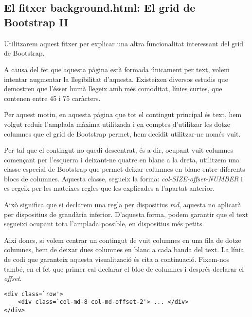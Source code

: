 \subsection{El fitxer background.html: El grid de Bootstrap II}

    \paragraph{}
    Utilitzarem aquest fitxer per explicar una altra funcionalitat interessant del grid de Bootstrap.

    A causa del fet que aquesta pàgina està formada únicament per text, volem intentar augmentar la llegibilitat d'aquesta. Existeixen diversos estudis que demostren que l'ésser humà llegeix amb més comoditat, línies curtes, que contenen entre 45 i 75 caràcters.

    Per aquest motiu, en aquesta pàgina que tot el contingut principal és text, hem volgut reduir l'amplada màxima utilitzada i en comptes d'utilitzar les dotze columnes que el grid de Bootstrap permet, hem decidit utilitzar-ne només vuit.

    Per tal que el contingut no quedi descentrat, és a dir, ocupant vuit columnes començant per l'esquerra i deixant-ne quatre en blanc a la dreta, utilitzem una classe especial de Bootstrap que permet deixar columnes en blanc entre diferents blocs de columnes. Aquesta classe, segueix la forma: \emph{col-SIZE-offset-NUMBER} i es regeix per les mateixes regles que les explicades a l'apartat anterior.

    Això significa que si declarem una regla per dispositius \emph{md}, aquesta no aplicarà per dispositius de grandària inferior. D'aquesta forma, podem garantir que el text segueixi ocupant tota l'amplada possible, en dispositius més petits.

    Així doncs, si volem centrar un contingut de vuit columnes en una fila de dotze columnes, hem de deixar dues columnes en blanc a cada banda del text. La línia de codi que garanteix aquesta visualització és cita a continuació. Fixem-nos també, en el fet que primer cal declarar el bloc de columnes i després declarar el \emph{offset}.

    \begin{lstlisting}[style=rawOwn,caption={Separació entre blocs de columnes d'una fila}]
<div class=`row'>
    <div class=`col-md-8 col-md-offset-2'> ... </div>
</div>
    \end{lstlisting}
